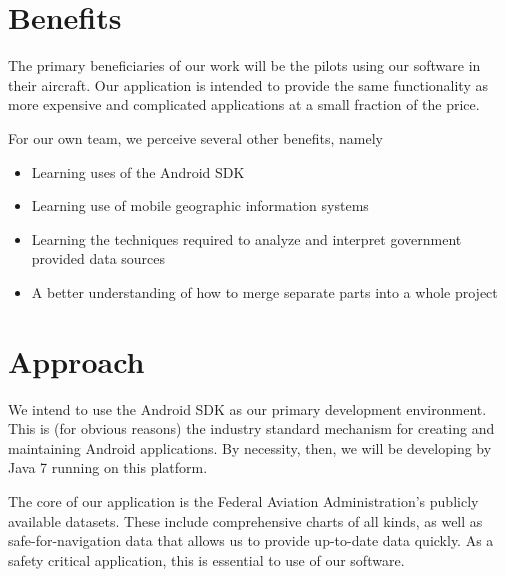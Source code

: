 \documentclass[10pt,a4paper]{article}
\begin{document}
\section{Benefits}
The primary beneficiaries of our work will be the pilots using our software in their aircraft. Our application is intended to provide the same functionality as more expensive and complicated applications at a small fraction of the price.

For our own team, we perceive several other benefits, namely
\begin{itemize}
\item Learning uses of the Android SDK
\item Learning use of mobile geographic information systems
\item Learning the techniques required to analyze and interpret government provided data sources
\item A better understanding of how to merge separate parts into a whole project
\end{itemize}

\section{Approach}
We intend to use the Android SDK as our primary development environment. This is (for obvious reasons) the industry standard mechanism for creating and maintaining Android applications. By necessity, then, we will be developing by Java 7 running on this platform. 

The core of our application is the Federal Aviation Administration's publicly available datasets. These include comprehensive charts of all kinds, as well as safe-for-navigation data that allows us to provide up-to-date data quickly. As a safety critical application, this is essential to use of our software.
\end{document}
